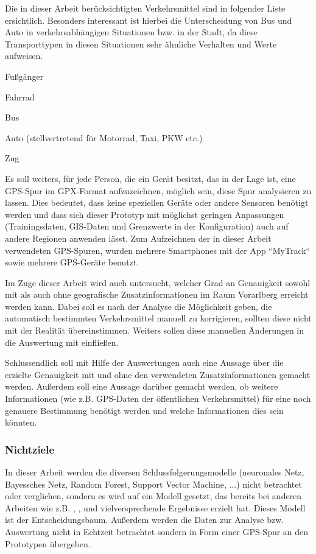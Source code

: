 Die in dieser Arbeit berücksichtigten Verkehrsmittel sind in folgender Liste ersichtlich. Besonders interessant ist hierbei die Unterscheidung von Bus und Auto in verkehrsabhängigen Situationen bzw. in der Stadt, da diese Transporttypen in diesen Situationen sehr ähnliche Verhalten und Werte aufweisen. 

\begin{pitemize}
\item Fußgänger
\item Fahrrad
\item Bus
\item Auto (stellvertretend für Motorrad, Taxi, PKW etc.)
\item Zug
\end{pitemize}

Es soll weiters, für jede Person, die ein Gerät besitzt, das in der Lage ist, eine GPS-Spur im GPX-Format aufzuzeichnen, möglich sein, diese Spur analysieren zu lassen. Dies bedeutet, dass keine speziellen Geräte oder andere Sensoren benötigt werden und dass sich dieser Prototyp mit möglichst geringen Anpassungen (Trainingsdaten, GIS-Daten und Grenzwerte in der Konfiguration) auch auf andere Regionen anwenden lässt. Zum Aufzeichnen der in dieser Arbeit verwendeten GPS-Spuren, wurden mehrere Smartphones mit der App ``MyTrack`` sowie mehrere GPS-Geräte benutzt.

Im Zuge dieser Arbeit wird auch untersucht, welcher Grad an Genauigkeit sowohl mit als auch ohne geografische Zusatzinformationen im Raum Vorarlberg erreicht werden kann. Dabei soll es nach der Analyse die Möglichkeit geben, die automatisch bestimmten Verkehrsmittel manuell zu korrigieren, sollten diese nicht mit der Realität übereinstimmen. Weiters sollen diese manuellen Änderungen in die Auswertung mit einfließen. 

Schlussendlich soll mit Hilfe der Auswertungen auch eine Aussage über die erzielte Genauigkeit mit und ohne den verwendeten Zusatzinformationen gemacht werden. Außerdem soll eine Aussage darüber gemacht werden, ob weitere Informationen (wie z.B. GPS-Daten der öffentlichen Verkehrsmittel) für eine noch genauere Bestimmung benötigt werden und welche Informationen dies sein könnten. 

\subsubsection{Nichtziele}

In dieser Arbeit werden die diversen Schlussfolgerungsmodelle (neuronales Netz, Bayessches Netz, Random Forest, Support Vector Machine, ...) nicht betrachtet oder verglichen, sondern es wird auf ein Modell gesetzt, das bereits bei anderen Arbeiten wie z.B. \cite{stenneth_transportation_2011}, \cite{reddy_using_2010}, \cite{sebastian_nagel_moglichkeitsstudie_2011} und  \cite{zheng_learning_2008} vielversprechende Ergebnisse erzielt hat. Dieses Modell ist der Entscheidungsbaum. Außerdem werden die Daten zur Analyse bzw. Auswertung nicht in Echtzeit betrachtet sondern in Form einer GPS-Spur an den Prototypen übergeben.

